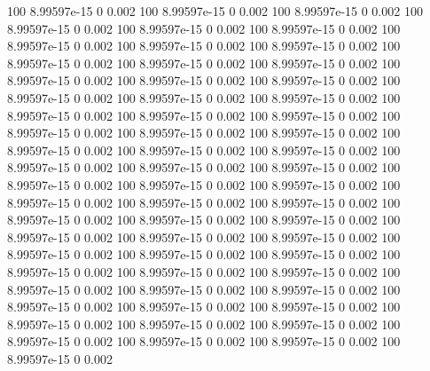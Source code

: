 100  8.99597e-15            0        0.002
100  8.99597e-15            0        0.002
100  8.99597e-15            0        0.002
100  8.99597e-15            0        0.002
100  8.99597e-15            0        0.002
100  8.99597e-15            0        0.002
100  8.99597e-15            0        0.002
100  8.99597e-15            0        0.002
100  8.99597e-15            0        0.002
100  8.99597e-15            0        0.002
100  8.99597e-15            0        0.002
100  8.99597e-15            0        0.002
100  8.99597e-15            0        0.002
100  8.99597e-15            0        0.002
100  8.99597e-15            0        0.002
100  8.99597e-15            0        0.002
100  8.99597e-15            0        0.002
100  8.99597e-15            0        0.002
100  8.99597e-15            0        0.002
100  8.99597e-15            0        0.002
100  8.99597e-15            0        0.002
100  8.99597e-15            0        0.002
100  8.99597e-15            0        0.002
100  8.99597e-15            0        0.002
100  8.99597e-15            0        0.002
100  8.99597e-15            0        0.002
100  8.99597e-15            0        0.002
100  8.99597e-15            0        0.002
100  8.99597e-15            0        0.002
100  8.99597e-15            0        0.002
100  8.99597e-15            0        0.002
100  8.99597e-15            0        0.002
100  8.99597e-15            0        0.002
100  8.99597e-15            0        0.002
100  8.99597e-15            0        0.002
100  8.99597e-15            0        0.002
100  8.99597e-15            0        0.002
100  8.99597e-15            0        0.002
100  8.99597e-15            0        0.002
100  8.99597e-15            0        0.002
100  8.99597e-15            0        0.002
100  8.99597e-15            0        0.002
100  8.99597e-15            0        0.002
100  8.99597e-15            0        0.002
100  8.99597e-15            0        0.002
100  8.99597e-15            0        0.002
100  8.99597e-15            0        0.002
100  8.99597e-15            0        0.002
100  8.99597e-15            0        0.002
100  8.99597e-15            0        0.002
100  8.99597e-15            0        0.002
100  8.99597e-15            0        0.002
100  8.99597e-15            0        0.002
100  8.99597e-15            0        0.002
100  8.99597e-15            0        0.002
100  8.99597e-15            0        0.002
100  8.99597e-15            0        0.002
100  8.99597e-15            0        0.002
100  8.99597e-15            0        0.002
100  8.99597e-15            0        0.002
100  8.99597e-15            0        0.002

